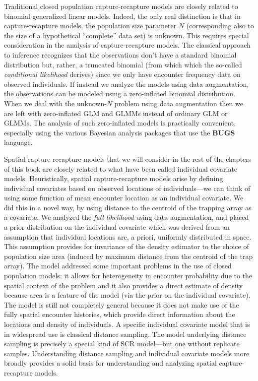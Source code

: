 Traditional closed population capture-recapture models are closely
related to binomial generalized linear models.  Indeed, the only real
distinction is that in capture-recapture models, the population size
parameter $N$ (corresponding also to the size of a hypothetical
``complete'' data set) is unknown.  This requires special
consideration in the analysis of capture-recapture models. The
classical approach to inference recognizes that the observations don't
have a standard binomial distribution but, rather, a truncated
binomial (from which which the so-called {\it conditional likelihood}
derives) since we only have encounter frequency data on observed
individuals. If instead we analyze the models using data augmentation,
the observations can be modeled using a zero-inflated binomial
distribution. When we deal with the unknown-$N$ problem using
data augmentation then we are left with zero-inflated GLM and GLMMs
instead of ordinary GLM or GLMMs. The analysis of such zero-inflated
models is practically convenient, especially using the various
Bayesian analysis packages that use the {\bf BUGS} language.

Spatial capture-recapture models that we will consider in the rest of
the chapters of this book are closely related to what have been called
individual covariate models. Heuristically, spatial capture-recapture
models arise by defining individual covariates based on observed
locations of individuals---we can think of using some function of
mean encounter location as an individual covariate. We did this in a
novel way, by using distance to the centroid of the trapping array as
a covariate. We analyzed the {\it full likelihood} using data
augmentation, and placed a prior distribution on the individual
covariate which was derived from an assumption that individual
locations are, a priori, uniformly distributed in space. This
assumption provides for invariance of the density estimator to the
choice of population size area (induced by maximum distance from the
centroid of the trap array). The model addressed some important problems in the
use of closed population models: it allows for heterogeneity in
encounter probability due to the spatial context of the problem and it
also provides a direct estimate of density because area is a feature
of the model (via the prior on the individual covariate). The model is
still not completely general because it does not make use of
the fully spatial encounter histories, which provide direct
information about the locations and density of individuals.  A
specific individual covariate model that is in widespread use is
classical distance sampling. The model underlying distance
sampling is precisely a special kind of SCR model---but one without
replicate samples. Understanding distance sampling and individual
covariate models more broadly provides a solid basis for understanding
and analyzing spatial capture-recapture models.

